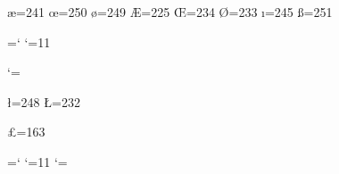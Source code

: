 


\chardef\ae=241	%
\chardef\oe=250 %
\chardef\o=249  %
\chardef\AE=225	%
\chardef\OE=234 %
\chardef\O=233  %
\chardef\i=245  %
\chardef\ss=251	%


\chardef\atcode=\catcode`\@	%
\catcode`\@=11			%


\def\aa{\accent202a}
\def\AA{\leavevmode\setbox0\hbox{h}\dimen@\ht0\advance\dimen@-1ex%
  \setbox0\hbox{A}\rlap{\raise.67\dimen@\hbox to \wd0{\hss\char202\hss}}A}

\catcode`\@=\atcode		%

\chardef\l=248 \chardef\L=232 %

\chardef\pounds=163	%



\def\H#1{{\accent205 #1}}	%
\def\u#1{{\accent198 #1}}	%
\def\v#1{{\accent207 #1}}	%
\def\`#1{{\accent193 #1}}	%
\def\'#1{{\accent194 #1}}	%
\def\^#1{{\accent195 #1}}	%
\def\~#1{{\accent196 #1}}	%
\def\"#1{{\accent200 #1}}	%



\chardef\atcode=\catcode`\@
\catcode`\@=11
\ifx\amstexloaded@\relax%
\def\D#1{{\accent199 #1}}	%
\def\B#1{{\accent197 #1}}	%
\let\graveaccent\`
\let\acuteaccent\'
\let\tildeaccent\~
\let\hataccent\^
\let\underscore\_
\else
\def\.#1{{\accent199 #1}}	%
\def\=#1{{\accent197 #1}}\fi	%
\catcode`\@=\atcode

